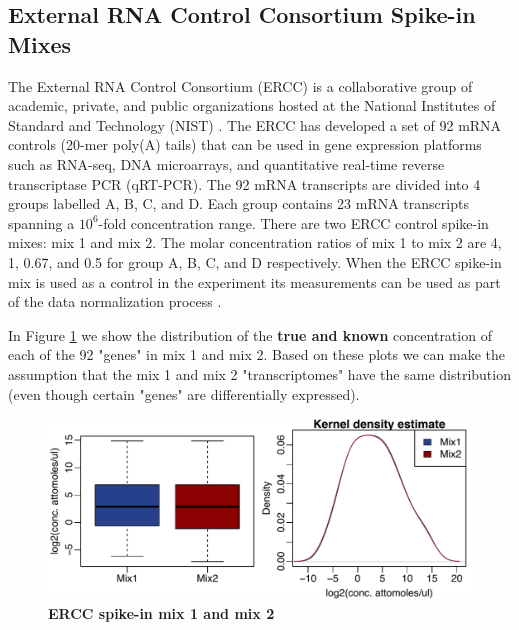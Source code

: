 \documentclass{article}\usepackage[]{graphicx}\usepackage[usenames,dvipsnames]{color}
\begin{document}
\subsection{External RNA Control Consortium Spike-in Mixes}

The External RNA Control Consortium (ERCC)
is a collaborative group of academic, private, and 
public organizations hosted at the 
National Institutes of Standard and Technology (NIST)
\cite{baker2005external, external2005proposed}. 
The ERCC has developed a set of 92 mRNA controls 
(20-mer poly(A) tails) that can be used in gene expression 
platforms such as RNA-seq, DNA microarrays, and 
quantitative real-time reverse transcriptase PCR (qRT-PCR).
The 92 mRNA transcripts are divided into 4 groups labelled
A, B, C, and D.  
Each group contains 23 mRNA transcripts 
spanning a $10^6$-fold concentration range.
There are two ERCC control spike-in mixes: mix 1 and mix 2. 
The molar concentration ratios of mix 1 to mix 2 are 4, 1, 0.67, and 
0.5 for group A, B, C, and D respectively. 
When the ERCC spike-in mix is used as a 
control in the experiment its measurements can be used 
as part of the data normalization process
\cite{loven2012revisiting, risso2014normalization}.

In Figure \ref{ercc} we show the distribution of the 
{\bf true and known} concentration of each of the 92 "genes" in 
mix 1 and mix 2. Based on these plots we can make the 
assumption that the mix 1 and mix 2 "transcriptomes" have
the same distribution 
(even though certain "genes" are differentially expressed).

\begin{figure}[!h]
\begin{center}
\includegraphics[width=\columnwidth]{ercc.pdf}
\end{center}
\small\normalsize
\caption[qsmooth algorithm]
         {{\bf ERCC spike-in mix 1 and mix 2}}
\label{ercc}
\end{figure}
\end{document}
